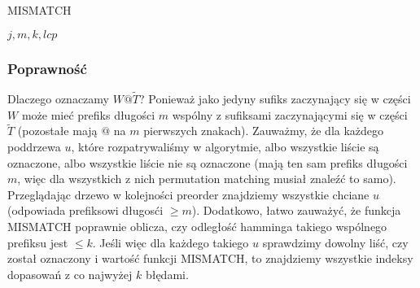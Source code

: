 \documentclass[a4paper,11pt]{article}
\newcommand{\algorithmicinput}{\textbf{input}}
\newcommand{\INPUT}{\item[\algorithmicinput]}
\begin{document}
\begin{algorithm}[H]
\caption{MISMATCH}
\begin{algorithmic}
\INPUT{$j,m,k,lcp$}
    \ENDIF
\ENDWHILE
{}
\end{algorithmic}
\end{algorithm}
\par
\subsubsection*{Poprawność}
Dlaczego oznaczamy $W@\tilde{T}$? Ponieważ jako jedyny sufiks zaczynający się w części $W$ może mieć prefiks długości $m$ wspólny z sufiksami zaczynającymi się w części $\tilde{T}$ (pozostałe mają $@$ na $m$ pierwszych znakach). Zauważmy, że dla każdego poddrzewa $u$, które rozpatrywaliśmy w algorytmie, albo wszystkie liście są oznaczone, albo wszystkie liście nie są oznaczone (mają ten sam prefiks długości $m$, więc dla wszystkich z nich permutation matching musiał znaleźć to samo). Przeglądając drzewo w kolejności preorder znajdziemy wszystkie chciane $u$ (odpowiada prefiksowi długosći $\geq m$). Dodatkowo, łatwo zauważyć, że funkcja MISMATCH poprawnie oblicza, czy odległość hamminga takiego wspólnego prefiksu jest $\leq k$. Jeśli więc dla każdego takiego $u$ sprawdzimy dowolny liść, czy został oznaczony i wartość funkcji MISMATCH, to znajdziemy wszystkie indeksy dopasowań z co najwyżej $k$ błędami.
\end{document}
